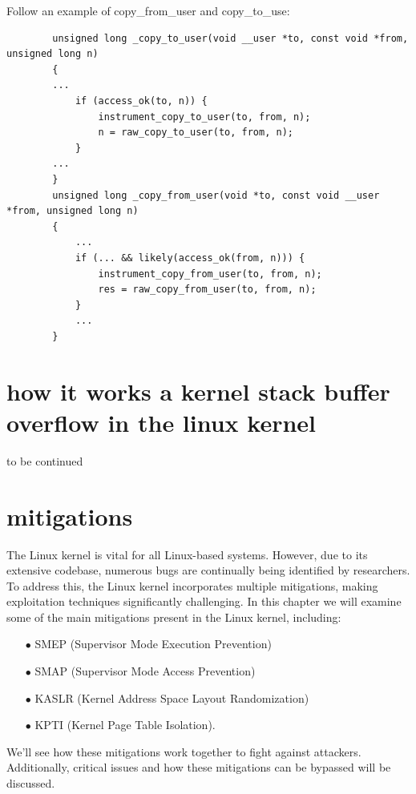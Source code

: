 \documentclass{report}
\begin{document}
    Follow an example of copy\_from\_user and copy\_to\_use:\newline
    \begin{verbatim}
        unsigned long _copy_to_user(void __user *to, const void *from, unsigned long n) 
        { 
        ... 
            if (access_ok(to, n)) { 
                instrument_copy_to_user(to, from, n); 
                n = raw_copy_to_user(to, from, n); 
            } 
        ... 
        } 
        unsigned long _copy_from_user(void *to, const void __user *from, unsigned long n) 
        { 
            ... 
            if (... && likely(access_ok(from, n))) { 
                instrument_copy_from_user(to, from, n); 
                res = raw_copy_from_user(to, from, n); 
            } 
            ... 
        } 
    \end{verbatim}
    \section{how it works a kernel stack buffer overflow in the linux kernel}
    to be continued    
    \clearpage
    \section{mitigations}
    The Linux kernel is vital for all Linux-based systems. However, due to its extensive codebase, numerous bugs are continually being identified by researchers. To address this, the Linux kernel incorporates multiple mitigations, making exploitation techniques significantly challenging.\newline
    In this chapter we will examine some of the main mitigations present in the Linux kernel, including:
    \begin{itemize}
        \item[$\bullet$] SMEP (Supervisor Mode Execution Prevention)
        \item[$\bullet$] SMAP (Supervisor Mode Access Prevention) 
        \item[$\bullet$] KASLR (Kernel Address Space Layout Randomization)   
        \item[$\bullet$] KPTI (Kernel Page Table Isolation).\newline 
    \end{itemize}
    We'll see how these mitigations work together to fight against attackers.\newline
    Additionally, critical issues and how these mitigations can be bypassed will be discussed.\newline
\end{document}
